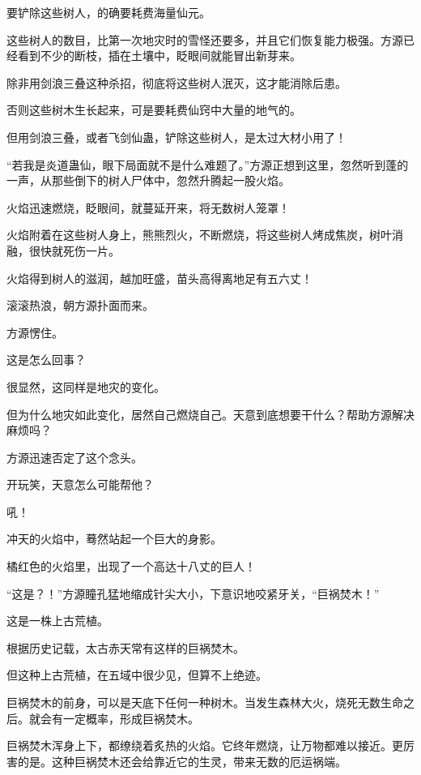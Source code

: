 
\begin{this_body}



要铲除这些树人，的确要耗费海量仙元。

这些树人的数目，比第一次地灾时的雪怪还要多，并且它们恢复能力极强。方源已经看到不少的断枝，插在土壤中，眨眼间就能冒出新芽来。

除非用剑浪三叠这种杀招，彻底将这些树人泯灭，这才能消除后患。

否则这些树木生长起来，可是要耗费仙窍中大量的地气的。

但用剑浪三叠，或者飞剑仙蛊，铲除这些树人，是太过大材小用了！

“若我是炎道蛊仙，眼下局面就不是什么难题了。”方源正想到这里，忽然听到蓬的一声，从那些倒下的树人尸体中，忽然升腾起一股火焰。

火焰迅速燃烧，眨眼间，就蔓延开来，将无数树人笼罩！

火焰附着在这些树人身上，熊熊烈火，不断燃烧，将这些树人烤成焦炭，树叶消融，很快就死伤一片。

火焰得到树人的滋润，越加旺盛，苗头高得离地足有五六丈！

滚滚热浪，朝方源扑面而来。

方源愣住。

这是怎么回事？

很显然，这同样是地灾的变化。

但为什么地灾如此变化，居然自己燃烧自己。天意到底想要干什么？帮助方源解决麻烦吗？

方源迅速否定了这个念头。

开玩笑，天意怎么可能帮他？

吼！

冲天的火焰中，蓦然站起一个巨大的身影。

橘红色的火焰里，出现了一个高达十八丈的巨人！

“这是？！”方源瞳孔猛地缩成针尖大小，下意识地咬紧牙关，“巨祸焚木！”

这是一株上古荒植。

根据历史记载，太古赤天常有这样的巨祸焚木。

但这种上古荒植，在五域中很少见，但算不上绝迹。

巨祸焚木的前身，可以是天底下任何一种树木。当发生森林大火，烧死无数生命之后。就会有一定概率，形成巨祸焚木。

巨祸焚木浑身上下，都缭绕着炙热的火焰。它终年燃烧，让万物都难以接近。更厉害的是。这种巨祸焚木还会给靠近它的生灵，带来无数的厄运祸端。


\end{this_body}
